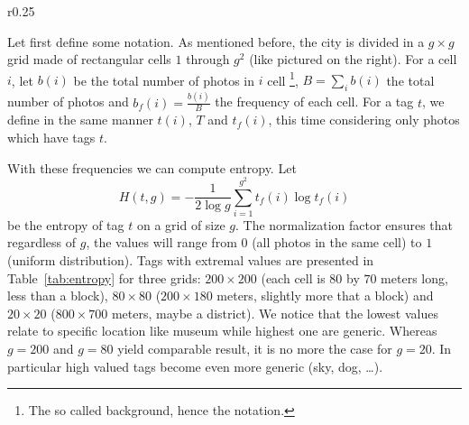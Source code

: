 \begin{wrapfigure}[6]{r}{0.25\textwidth}
\centering
\vspace{-.6\baselineskip}

\end{wrapfigure}
Let first define some notation. As mentioned before, the city is divided in a
$g\times g$ grid made of rectangular cells $1$ through $g^2$ (like pictured on
the right). For a cell $i$, let $b(i)$ be the total number of photos in
$i$ cell \footnote{The so called background, hence the notation.},
$B=\sum_i b(i)$ the total number of photos and $b_f(i)=\frac{b(i)}{B}$ the
frequency of each cell. For a tag $t$, we define in the same manner $t(i)$,
$T$ and $t_f(i)$, this time considering only photos which have tags $t$.

With these frequencies we can compute entropy. Let \[H(t,g) = -\frac{1}{2\log
g}\sum_{i=1}^{g^2} t_f(i)\log t_f(i)\] be the entropy of tag $t$ on a grid of
size $g$. The normalization factor ensures that regardless of $g$, the values
will range from $0$ (all photos in the same cell) to $1$ (uniform
distribution). Tags with extremal values are presented in
Table~\vref{tab:entropy} for three grids: $200\times 200$ (each cell is $80$
by $70$ meters long, less than a block), $80\times 80$ ($200\times 180$
meters, slightly more that a block) and $20\times 20$ ($800\times 700$ meters,
maybe a district). We notice that the lowest values relate to specific
location like museum while highest one are generic. Whereas $g=200$ and
$g=80$ yield comparable result, it is no more the case for $g=20$. In
particular high valued tags become even more generic (sky, dog, \dots).

